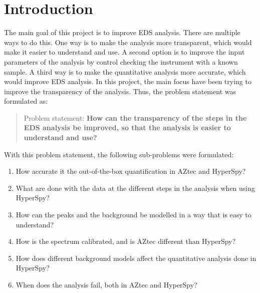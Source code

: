 \chapter{Introduction}
\label{chap:introduction}

%
%
The main goal of this project is to improve EDS analysis. There are multiple ways to do this.
One way is to make the analysis more transparent, which would make it easier to understand and use.
A second option is to improve the input parameters of the analysis by control checking the instrument with a known sample.
A third way is to make the quantitative analysis more accurate, which would improve EDS analysis.
In this project, the main focus have been trying to improve the transparency of the analysis. Thus, the problem statement was formulated as:

\begin{quote}
    Problem statement: \textbf{How can the transparency of the steps in the EDS analysis be improved, so that the analysis is easier to understand and use?
    }
\end{quote}


With this problem statement, the following sub-problems were formulated:


\begin{enumerate}
    \item How accurate it the out-of-the-box quantification in AZtec and HyperSpy?
    \item What are done with the data at the different steps in the analysis when using HyperSpy?
    \item How can the peaks and the background be modelled in a way that is easy to understand?
    \item How is the spectrum calibrated, and is AZtec different than HyperSpy?
    \item How does different background models affect the quantitative analysis done in HyperSpy?
    \item When does the analysis fail, both in AZtec and HyperSpy?
\end{enumerate}


